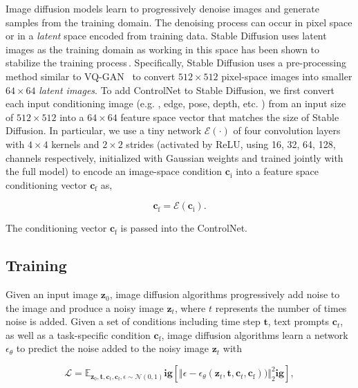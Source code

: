 	Image diffusion models learn to progressively denoise images and generate samples from the training domain.  The denoising process can occur in pixel space or in a {\em latent} space encoded from training data. Stable Diffusion uses latent images as the training domain as working in this space has been shown to stabilize the training process\,\cite{rombach2021highresolution}.
	Specifically, Stable Diffusion uses a pre-processing method similar to VQ-GAN~\cite{esser2021taming} to convert $512\times 512$ pixel-space images into smaller $64\times 64$ {\em latent images}. To add ControlNet to Stable Diffusion, we first convert each input conditioning image (e.g. , edge, pose, depth, etc. ) from an input size of $512\times 512$ into a
	$64\times 64$ feature space vector that matches the size of Stable Diffusion. In particular, we use a tiny network
	$\mathcal{E}(\cdot)$ of four convolution layers with $4\times 4$ kernels and $2 \times 2$ strides (activated by ReLU, using 16, 32, 64, 128, channels respectively, initialized with Gaussian weights and trained jointly with the full model) to encode an image-space condition $\bm{c}_\text{i}$ into a feature space conditioning vector
	$\bm{c}_\text{f}$ as,

\begin{equation}
		\bm{c}_\text{f}=\mathcal{E}(\bm{c}_\text{i}).
	\end{equation}

	The conditioning vector $\bm{c}_\text{f}$ is passed into the ControlNet.

	\subsection{Training}
	\label{sec:train}

	Given an input image $\bm{z}_0$, image diffusion algorithms progressively add noise to the image and produce a noisy image
	$\bm{z}_t$, where $t$ represents the number of times noise is added. Given a set of conditions including time step $\bm{t}$, text prompts $\bm{c}_t$, as well as a task-specific condition $\bm{c}_\text{f}$, image diffusion algorithms learn a network $\epsilon_\theta$ to predict the noise added to the noisy image $\bm{z}_t$ with

\begin{equation}
		\mathcal{L} = \mathbb{E}_{\bm{z}_0, \bm{t}, \bm{c}_t, \bm{c}_\text{f}, \epsilon \sim \mathcal{N}(0, 1) }\mathbf{ig}[ \Vert \epsilon - \epsilon_\theta(\bm{z}_{t}, \bm{t}, \bm{c}_t, \bm{c}_\text{f})) \Vert_{2}^{2}\mathbf{ig}],
		\label{eq:loss}
	\end{equation}

